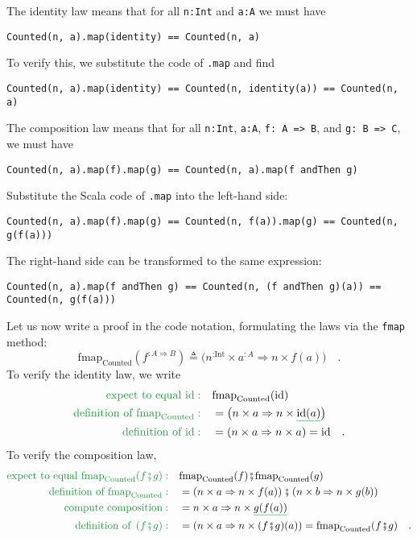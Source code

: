 The identity law means that for all \lstinline!n:Int! and \lstinline!a:A!
we must have
\begin{lstlisting}
Counted(n, a).map(identity) == Counted(n, a)
\end{lstlisting}
To verify this, we substitute the code of \lstinline!.map! and find
\begin{lstlisting}
Counted(n, a).map(identity) == Counted(n, identity(a)) == Counted(n, a)
\end{lstlisting}

The composition law means that for all \lstinline!n:Int!, \lstinline!a:A!,
\lstinline!f: A => B!, and \lstinline!g: B => C!, we must have
\begin{lstlisting}
Counted(n, a).map(f).map(g) == Counted(n, a).map(f andThen g)
\end{lstlisting}
Substitute the Scala code of \lstinline!.map! into the left-hand
side:
\begin{lstlisting}
Counted(n, a).map(f).map(g) == Counted(n, f(a)).map(g) == Counted(n, g(f(a)))
\end{lstlisting}
The right-hand side can be transformed to the same expression:
\begin{lstlisting}
Counted(n, a).map(f andThen g) == Counted(n, (f andThen g)(a)) == Counted(n, g(f(a)))
\end{lstlisting}

Let us now write a proof in the code notation, formulating the laws
via the \lstinline!fmap! method:
\[
\text{fmap}_{\text{Counted}}(f^{:A\Rightarrow B})\triangleq\big(n^{:\text{Int}}\times a^{:A}\Rightarrow n\times f(a)\big)\quad.
\]
To verify the identity law, we write
\begin{align*}
{\color{greenunder}\text{expect to equal }\text{id}:}\quad & \text{fmap}_{\text{Counted}}(\text{id})\\
{\color{greenunder}\text{definition of }\text{fmap}_{\text{Counted}}:}\quad & =\big(n\times a\Rightarrow n\times\gunderline{\text{id}(a)}\big)\\
{\color{greenunder}\text{definition of }\text{id}:}\quad & =\left(n\times a\Rightarrow n\times a\right)=\text{id}\quad.
\end{align*}
To verify the composition law,
\begin{align*}
{\color{greenunder}\text{expect to equal }\text{fmap}_{\text{Counted}}(f\bef g):}\quad & \text{fmap}_{\text{Counted}}(f)\bef\text{fmap}_{\text{Counted}}(g)\\
{\color{greenunder}\text{definition of }\text{fmap}_{\text{Counted}}:}\quad & =\left(n\times a\Rightarrow n\times f(a)\right)\bef\left(n\times b\Rightarrow n\times g(b)\right)\\
{\color{greenunder}\text{compute composition}:}\quad & =n\times a\Rightarrow n\times\gunderline{g(f(a))}\\
{\color{greenunder}\text{definition of }\left(f\bef g\right):}\quad & =\left(n\times a\Rightarrow n\times(f\bef g)(a)\right)=\text{fmap}_{\text{Counted}}(f\bef g)\quad.
\end{align*}

